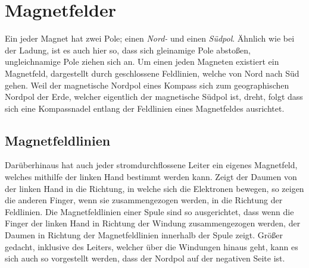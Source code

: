 \documentclass{article}
\begin{document}
\section{Magnetfelder}
Ein jeder Magnet hat zwei Pole; einen \emph{Nord-} und einen \emph{Südpol}. Ähnlich wie bei der Ladung, ist es auch hier so, dass sich gleinamige Pole abstoßen, ungleichnamige Pole ziehen sich an. \newline  
Um einen jeden Magneten existiert ein Magnetfeld, dargestellt durch geschlossene Feldlinien, welche von Nord nach Süd gehen. Weil der magnetische Nordpol eines Kompass sich zum geographischen Nordpol der Erde, welcher eigentlich der magnetische Südpol ist, dreht, folgt dass sich eine Kompassnadel entlang der Feldlinien eines Magnetfeldes ausrichtet. \newline 
 
\subsection{Magnetfeldlinien}
\begin{minipage}{\dimexpr\linewidth-3cm} 
 Darüberhinaus hat auch jeder stromdurchflossene Leiter ein eigenes Magnetfeld, welches mithilfe der linken Hand bestimmt werden kann. Zeigt der Daumen von der linken Hand in die Richtung, in welche sich die Elektronen bewegen, so zeigen die anderen Finger, wenn sie zusammengezogen werden, in die Richtung der Feldlinien. \newline
 Die Magnetfeldlinien einer Spule sind so ausgerichtet, dass wenn die Finger der linken Hand in Richtung der Windung zusammengezogen werden, der Daumen in Richtung der Magnetfeldlinien innerhalb der Spule zeigt. Größer gedacht, inklusive des Leiters, welcher über die Windungen hinaus geht, kann es sich auch so vorgestellt werden, dass der Nordpol auf der negativen Seite ist.
\end{minipage}
\hfill
\begin{minipage}{3cm}
 \center
\end{minipage} 
 
\end{document}
